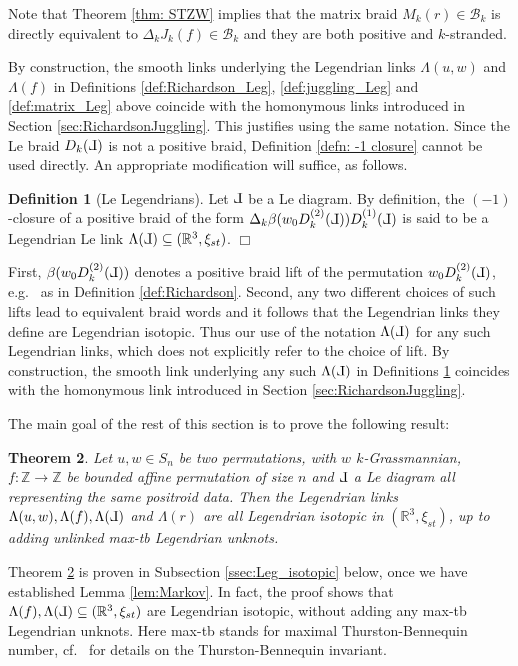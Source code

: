 \documentclass[10pt]{amsart}
\theoremstyle{plain}
\newtheorem{thm}{Theorem}[section]
\theoremstyle{definition}
\newtheorem{definition}[thm]{Definition}
\theoremstyle{remark}
\numberwithin{equation}{section}
\newcommand{\Z}{\mathbb{Z}}
\newcommand{\R}{\mathbb{R}}
\newcommand{\La}{\Lambda}
\newcommand{\sse}{\subseteq}
\newcommand{\lr}{\longrightarrow}
\newcommand{\cB}{\mathcal{B}}
\def\Le{\reflectbox{$\mathrm{L}$}}
\begin{document}
\noindent Note that Theorem \ref{thm: STZW} implies that the matrix braid $M_k(r)\in\cB_k$ is directly equivalent to $\Delta_kJ_k(f)\in\cB_k$ and they are both positive and $k$-stranded.

\noindent By construction, the smooth links underlying the Legendrian links $\Lambda(u, w)$ and $\Lambda(f)$ in Definitions \ref{def:Richardson_Leg}, \ref{def:juggling_Leg} and \ref{def:matrix_Leg} above coincide with the homonymous links introduced in Section \ref{sec:RichardsonJuggling}. This justifies using the same notation. Since the Le braid $D_k(\Le)$ is not a positive braid,  Definition \ref{defn: -1 closure} cannot be used directly. An appropriate modification will suffice, as follows.

\begin{definition}[Le Legendrians]\label{def:Le_Leg}
Let $\Le$ be a Le diagram. By definition, the $(-1)$-closure of a positive braid  of the form $\Delta_k \beta(w_0D_k^{(2)}(\Le))D^{(1)}_{k}(\Le)$ is said to be a Legendrian Le link $\Lambda(\Le) \subseteq (\R^{3},\xi_{st})$.
\hfill$\Box$
\end{definition}

\noindent First, $\beta(w_0D_{k}^{(2)}(\Le))$ denotes a positive braid lift of  the permutation $w_0D_{k}^{(2)}(\Le)$, e.g.~ as in Definition \ref{def:Richardson}. Second, any two different choices of such lifts lead to equivalent braid words and it follows that the Legendrian links they define are Legendrian isotopic. Thus our use of the notation $\Lambda(\Le)$ for any such Legendrian links, which does not explicitly refer to the choice of lift. By construction, the smooth link underlying any such $\Lambda(\Le)$ in Definitions \ref{def:Le_Leg} coincides with the homonymous link introduced in Section \ref{sec:RichardsonJuggling}.

The main goal of the rest of this section is to prove the following result:

\begin{thm}\label{thm:Leg_allsame} Let $u, w \in S_n$ be two permutations, with $w$  $k$-Grassmannian, $f:\Z\lr\Z$ be bounded affine permutation of size $n$ and $\Le$ a Le diagram  all representing the same positroid data. Then the Legendrian links $\Lambda(u, w),\Lambda(f),\Lambda(\Le)$ and $\La(r)$ are all Legendrian isotopic in $(\R^{3},\xi_{st})$, up to adding unlinked max-tb Legendrian unknots.
\end{thm}

\noindent Theorem \ref{thm:Leg_allsame} is proven in Subsection \ref{ssec:Leg_isotopic} below, once we have established Lemma \ref{lem:Markov}. In fact, the proof shows that $\Lambda(f),\Lambda(\Le)\sse(\R^{3},\xi_{st})$ are Legendrian isotopic, without adding any max-tb Legendrian unknots. Here max-tb stands for maximal Thurston-Bennequin number, cf.~ \cite[Section 2.6]{Etnyre05} for details on the Thurston-Bennequin invariant.
\end{document}
